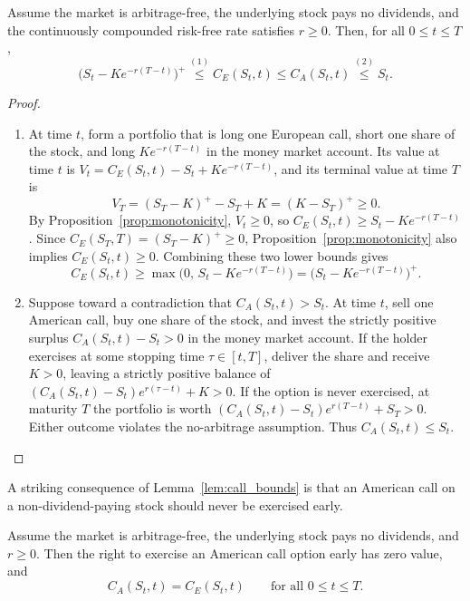 \begin{lemma}
\label{lem:call_bounds}
Assume the market is arbitrage-free, the underlying stock pays no dividends, and the continuously compounded risk-free rate satisfies $r \ge 0$. Then, for all $0 \le t \le T$,
\[
    \bigl(S_t - K e^{-r(T-t)}\bigr)^+ \stackrel{(1)}{\le} C_E(S_t, t) \le C_A(S_t, t) \stackrel{(2)}{\le} S_t.
\]
\end{lemma}

\begin{proof}
\begin{enumerate}
    \item At time $t$, form a portfolio that is long one European call, short one share of the stock, and long $K e^{-r(T-t)}$ in the money market account. Its value at time $t$ is $V_t = C_E(S_t, t) - S_t + K e^{-r(T-t)}$, and its terminal value at time $T$ is
    \[
        V_T = (S_T - K)^+ - S_T + K = (K - S_T)^+ \ge 0.
    \]
    By Proposition~\ref{prop:monotonicity}, $V_t \ge 0$, so $C_E(S_t, t) \ge S_t - K e^{-r(T-t)}$. Since $C_E(S_T, T) = (S_T - K)^+ \ge 0$, Proposition~\ref{prop:monotonicity} also implies $C_E(S_t, t) \ge 0$. Combining these two lower bounds gives
    \[
        C_E(S_t, t) \ge \max\bigl(0,\, S_t - K e^{-r(T-t)}\bigr) = \bigl(S_t - K e^{-r(T-t)}\bigr)^+.
    \]
    \item Suppose toward a contradiction that $C_A(S_t, t) > S_t$. At time $t$, sell one American call, buy one share of the stock, and invest the strictly positive surplus $C_A(S_t, t) - S_t > 0$ in the money market account. If the holder exercises at some stopping time $\tau \in [t, T]$, deliver the share and receive $K > 0$, leaving a strictly positive balance of $(C_A(S_t, t) - S_t) e^{r(\tau - t)} + K > 0$. If the option is never exercised, at maturity $T$ the portfolio is worth $(C_A(S_t, t) - S_t) e^{r(T-t)} + S_T > 0$. Either outcome violates the no-arbitrage assumption. Thus $C_A(S_t, t) \le S_t$.
\end{enumerate}
\end{proof}

A striking consequence of Lemma~\ref{lem:call_bounds} is that an American call on a non-dividend-paying stock should never be exercised early.

\begin{theorem}
\label{thm:american_call_early_exercise}
Assume the market is arbitrage-free, the underlying stock pays no dividends, and $r \ge 0$. Then the right to exercise an American call option early has zero value, and
\[
    C_A(S_t, t) = C_E(S_t, t) \qquad \text{for all } 0 \le t \le T.
\]
\end{theorem}

